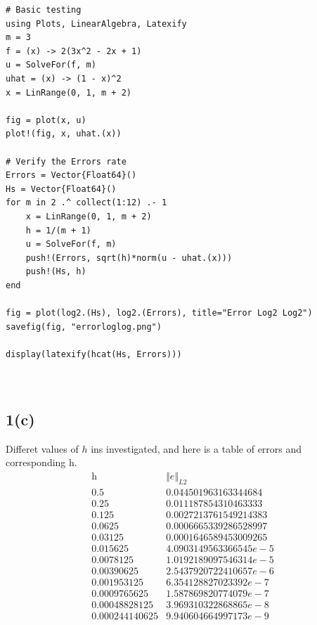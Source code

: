 \documentclass[]{article}
\begin{document}
\begin{verbatim}
# Basic testing
using Plots, LinearAlgebra, Latexify
m = 3
f = (x) -> 2(3x^2 - 2x + 1)
u = SolveFor(f, m)
uhat = (x) -> (1 - x)^2
x = LinRange(0, 1, m + 2)

fig = plot(x, u)
plot!(fig, x, uhat.(x))

# Verify the Errors rate
Errors = Vector{Float64}()
Hs = Vector{Float64}()
for m in 2 .^ collect(1:12) .- 1
    x = LinRange(0, 1, m + 2)
    h = 1/(m + 1)
    u = SolveFor(f, m)
    push!(Errors, sqrt(h)*norm(u - uhat.(x)))
    push!(Hs, h)
end

fig = plot(log2.(Hs), log2.(Errors), title="Error Log2 Log2")
savefig(fig, "errorloglog.png")

display(latexify(hcat(Hs, Errors)))

            
        \end{verbatim}
    \subsection*{1(c)}
        Differet values of $h$ ins investigated, and here is a table of errors and corresponding h. 
        \begin{equation}\tag{1.c.1}\label{eqn:1.c.1}
            \begin{array}{|c|c|}
                \text{h}  & \Vert e\Vert_{L2}\\
                0.5 & 0.044501963163344684 \\
                0.25 & 0.011187854310463333 \\
                0.125 & 0.0027213761549214383 \\
                0.0625 & 0.0006665339286528997 \\
                0.03125 & 0.0001646589453009265 \\
                0.015625 & 4.0903149563366545e-5 \\
                0.0078125 & 1.0192189097546314e-5 \\
                0.00390625 & 2.5437920722410657e-6 \\
                0.001953125 & 6.354128827023392e-7 \\
                0.0009765625 & 1.587869820774079e-7 \\
                0.00048828125 & 3.969310322868865e-8 \\
                0.000244140625 & 9.940604664997173e-9 \\
                \end{array}
        \end{equation}
\end{document}
